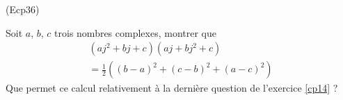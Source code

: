 \begin{tiny}(Ecp36)\end{tiny} Soit $a$, $b$, $c$ trois nombres complexes, montrer que
\begin{multline*}
  (aj^2+bj+c)(aj+bj^2+c) \\=
  \frac{1}{2}\left( (b-a)^2+(c-b)^2+(a-c)^2\right) 
\end{multline*}
Que permet ce calcul relativement à la dernière question de l'exercice \ref{cp14} ?